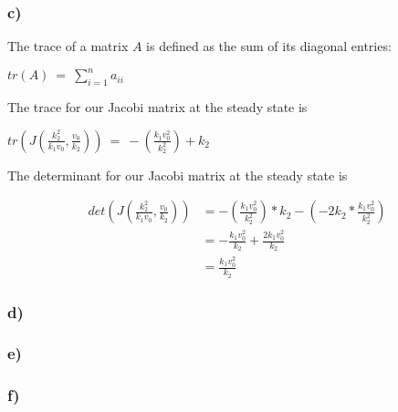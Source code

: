 \documentclass[]{scrartcl}
\begin{document}

\subsubsection*{c)}

\noindent The trace of a matrix $A$ is defined as the sum of its diagonal entries:

\begin{center}
$
tr(A) ~=~ \sum_{i=1}^n a_{ii}
$
\end{center}

\noindent The trace for our Jacobi matrix at the steady state is

\begin{center}
$
tr \left( J \left( \frac{k_2^2}{k_1 v_0} , \frac{v_0}{k_2} \right) \right) ~=~ -\left( \frac{k_1 v_0^2}{k_2^2} \right) + k_2
$
\end{center}

\noindent The determinant for our Jacobi matrix at the steady state is

\begin{center}
\begin{align*}
det \left( J \left( \frac{k_2^2}{k_1 v_0} , \frac{v_0}{k_2} \right) \right) &= -\left( \frac{k_1 v_0^2}{k_2^2} \right) * k_2 - \left( -2 k_2 * \frac{k_1 v_0^2}{k_2^2} \right) \\
&= - \frac{k_1 v_0^2}{k_2} + \frac{2 k_1 v_0^2}{k_2} \\
&= \frac{k_1 v_0^2}{k_2}
\end{align*}
\end{center}



\subsubsection*{d)}




\subsubsection*{e)}




\subsubsection*{f)}
\end{document}

